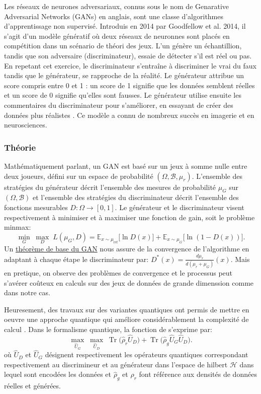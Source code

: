 \documentclass[a4paper]{article}
\begin{document}
Les réseaux de neurones adversariaux, connus sous le nom de Genarative Adversarial Networks (GANs) en anglais, sont une classe d'algorithmes d'apprentissage non supervisé. Introduis en 2014 par Goodfellow et al. 2014, il s'agit d'un modèle génératif où deux réseaux de neuronnes sont placés en compétition dans un scénario de théori des jeux. L'un génère un échantillion, tandis que son adversaire (discriminateur), essaie de détecter s'il est réel ou pas. En repetant cet exercice, le discriminateur s'entraîne à discriminer le vrai du faux tandis que le générateur, se rapproche de la réalité. Le générateur attribue un score compris entre 0 et 1 : un score de 1 signifie que les données semblent réelles et un score de 0 signifie qu’elles sont fausses.
Le générateur utilise ensuite les commentaires du discriminateur pour s’améliorer, en essayant de créer des données plus réalistes \cite{DanielGANs}. 
Ce modèle a connu de nombreux succès en imagerie et en neurosciences.  

\subsubsection{Théorie}

Mathématiquement parlant, un GAN est basé sur un jeux à somme nulle entre deux joueurs, défini sur un espace de probabilité $ ( \Omega, \mathcal{B}, \mu_{r})$. L'ensemble des stratégies du générateur décrit l'ensemble des mesures de probabilité $ \mu_{G}$ sur $ ( \Omega, \mathcal{B})$ et l'ensemble des stratégies du discriminateur décrit l'ensemble des fonctions mesurables $D : \Omega \rightarrow [0,1]$. Le générateur et le discriminateur visent respectivement à minimiser et à maximiser une fonction de gain, soit le problème minmax: 
$$ \underset{G}{\min}\;\underset{D}{\max}\; L(\mu_{G},D)=
\mathbb{E}_{x \sim \mu_{\mathrm{ref}}}\bigl[\ln D(x)\bigr]
+
\mathbb{E}_{x \sim \mu_G}\bigl[\ln(1 - D(x))\bigr].$$
Un \href{https://fr.wikipedia.org/wiki/R%C3%A9seaux_antagonistes_g%C3%A9n%C3%A9ratifs}{théorème de base du GAN} nous assure de la convergence de l'algorithme en adaptant à chaque étape le discriminateur par: 
$D^*(x) = \frac{d\mu_r}{d(\mu_r + \mu_G)}(x)$. Mais en pretique, on observe des problèmes de convergence et le processus peut s'avérer coûteux en calculs sur des jeux de données de grande dimenssion comme dans notre cas.

Heuresement, des travaux sur des variantes quantiques ont permis de mettre en oeuvre une approche quantique qui améliore considérablement la complexité de calcul \cite{QGANs}. Dans le formalisme quantique, la fonction de s'exprime par:
 \[
\max_{\hat{U}_G} \; \max_{\hat{U}_D} \;
\operatorname{Tr}\!\big(\hat{\rho}_r \hat{U}_D\big)
+
\operatorname{Tr}\!\big(\hat{\rho}_g \hat{U}_G \hat{U}_D\big).
\]
où $\hat{U}_D$ et $\hat{U}_G$ désignent respectivement les opérateurs quantiques correspondant respectivement au discrimineur et au générateur dans l'espace de hilbert $\mathcal{H}$ dans lequel sont encodées les données et $\hat{\rho}_g$ et $\hat{\rho}_r$ font référence aux densités de données réelles et générées.
\end{document}
